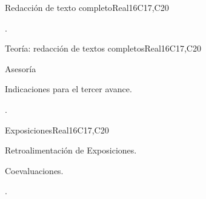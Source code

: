 \begin{syllabus}
\begin{unit}{Redacción de texto completo}{}{Real}{16}{C17,C20}
  \begin{learningoutcomes}
   \item .%
  \end{learningoutcomes}
\end{unit}

\begin{unit}{Teoría: redacción de textos completos}{}{Real}{16}{C17,C20}
  \begin{topics}
      \item Asesoría
      \item Indicaciones para el tercer avance.
  \end{topics}

  \begin{learningoutcomes}
   \item .%
  \end{learningoutcomes}
\end{unit}

\begin{unit}{Exposiciones}{}{Real}{16}{C17,C20}
  \begin{topics}
      \item Retroalimentación de Exposiciones.
      \item Coevaluaciones.
  \end{topics}

  \begin{learningoutcomes}
   \item .%
  \end{learningoutcomes}
\end{unit}

\begin{coursebibliography}
\end{coursebibliography}

\end{syllabus}
